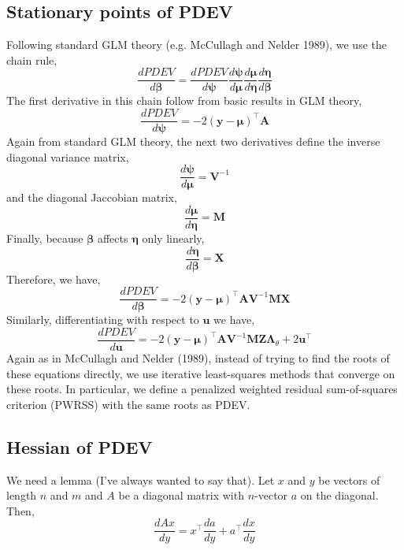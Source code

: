 \documentclass{jss}
\begin{document}
\subsection{Stationary points of PDEV}

Following standard GLM theory (e.g. McCullagh and Nelder 1989), we use the chain rule,
\begin{displaymath}
\frac{d PDEV}{d \bm\beta} = 
\frac{d PDEV}{d \bm\psi}
\frac{d \bm\psi}{d \bm\mu}
\frac{d \bm\mu}{d \bm\eta}
\frac{d \bm\eta}{d \bm\beta}
\end{displaymath}
The first derivative in this chain follow from basic results in GLM theory,
\begin{displaymath}
\frac{d PDEV}{d \bm\psi} = 
-2(\bm y - \bm\mu)^\top \bm A
\end{displaymath}
Again from standard GLM theory, the next two derivatives define the inverse diagonal variance
matrix,
\begin{displaymath}
\frac{d \bm\psi}{d \bm\mu} = \bm V^{-1}
\end{displaymath}
and the diagonal Jaccobian matrix,
\begin{displaymath}
\frac{d \bm\mu}{d \bm\eta} = \bm M
\end{displaymath}
Finally, because $\bm\beta$ affects $\bm\eta$ only linearly,
\begin{displaymath}
\frac{d \bm\eta}{d \bm\beta} = \bm X
\end{displaymath}
Therefore, we have,
\begin{equation}
\frac{d PDEV}{d \bm\beta} = 
-2(\bm y - \bm\mu)^\top \bm A
\bm V^{-1}
\bm M
\bm X
\label{eq:dPDEVdbeta}
\end{equation}
Similarly, differentiating with respect to $\bm u$ we have,
\begin{equation}
\frac{d PDEV}{d \bm u} = 
-2(\bm y - \bm\mu)^\top \bm A
\bm V^{-1}
\bm M
\bm Z \bm\Lambda_\theta +
2\bm u^\top
\label{eq:dPDEVdu}
\end{equation}
Again as in McCullagh and Nelder (1989), instead of trying to find the
roots of these equations directly, we use iterative least-squares
methods that converge on these roots. In particular, we define a
penalized weighted residual sum-of-squares criterion (PWRSS) with the same
roots as PDEV.

\subsection{Hessian of PDEV}

We need a lemma (I've always wanted to say that). Let $x$ and $y$ be
vectors of length $n$ and $m$ and $A$ be a diagonal matrix with
$n$-vector $a$ on the diagonal. Then,
\begin{equation}
\frac{dAx}{dy} = x^\top \frac{da}{dy} + a^\top \frac{dx}{dy}
\end{equation}
\end{document}
